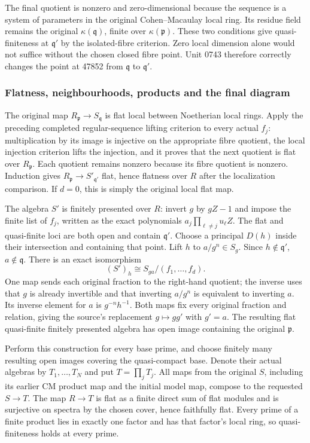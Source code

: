The final quotient is nonzero and zero-dimensional because the sequence is a system of parameters in the original Cohen--Macaulay local ring. Its residue field remains the original \(\kappa(\mathfrak q)\), finite over \(\kappa(\mathfrak p)\). These two conditions give quasi-finiteness at \(\mathfrak q'\) by the isolated-fibre criterion. Zero local dimension alone would not suffice without the chosen closed fibre point. Unit 0743 therefore correctly changes the point at 47852 from \(\mathfrak q\) to \(\mathfrak q'\).

\subsubsection{Flatness, neighbourhoods, products and the final diagram}\label{algebra-proof-073-flatness-neighbourhoods-products-and-the-final-diagram}

The original map \(R_{\mathfrak p}\to S_{\mathfrak q}\) is flat local between Noetherian local rings. Apply the preceding completed regular-sequence lifting criterion to every actual \(f_j\): multiplication by its image is injective on the appropriate fibre quotient, the local injection criterion lifts the injection, and it proves that the next quotient is flat over \(R_{\mathfrak p}\). Each quotient remains nonzero because its fibre quotient is nonzero. Induction gives \(R_{\mathfrak p}\to S'_{\mathfrak q'}\) flat, hence flatness over \(R\) after the localization comparison. If \(d=0\), this is simply the original local flat map.

The algebra \(S'\) is finitely presented over \(R\): invert \(g\) by \(gZ-1\) and impose the finite list of \(f_j\), written as the exact polynomials \(a_j\prod_{\ell\ne j}u_\ell Z\). The flat and quasi-finite loci are both open and contain \(\mathfrak q'\). Choose a principal \(D(h)\) inside their intersection and containing that point. Lift \(h\) to \(a/g^n\in S_g\). Since \(h\notin\mathfrak q'\), \(a\notin\mathfrak q\). There is an exact isomorphism \[
(S')_h\cong S_{ga}/(f_1,\ldots,f_d).
\] One map sends each original fraction to the right-hand quotient; the inverse uses that \(g\) is already invertible and that inverting \(a/g^n\) is equivalent to inverting \(a\). Its inverse element for \(a\) is \(g^{-n}h^{-1}\). Both maps fix every original fraction and relation, giving the source's replacement \(g\mapsto gg'\) with \(g'=a\). The resulting flat quasi-finite finitely presented algebra has open image containing the original \(\mathfrak p\).

Perform this construction for every base prime, and choose finitely many resulting open images covering the quasi-compact base. Denote their actual algebras by \(T_1,\ldots,T_N\) and put \(T=\prod_jT_j\). All maps from the original \(S\), including its earlier CM product map and the initial model map, compose to the requested \(S\to T\). The map \(R\to T\) is flat as a finite direct sum of flat modules and is surjective on spectra by the chosen cover, hence faithfully flat. Every prime of a finite product lies in exactly one factor and has that factor's local ring, so quasi-finiteness holds at every prime.

